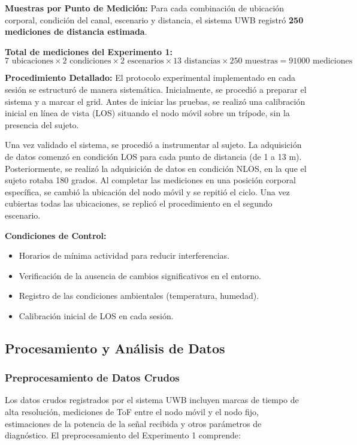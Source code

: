 \textbf{Muestras por Punto de Medición:}
Para cada combinación de ubicación corporal, condición del canal, escenario y distancia, el sistema UWB registró \textbf{250 mediciones de distancia estimada}.

\textbf{Total de mediciones del Experimento 1:}
$$7 \text{ ubicaciones} \times 2 \text{ condiciones} \times 2 \text{ escenarios} \times 13 \text{ distancias} \times 250 \text{ muestras} = 91000 \text{ mediciones}$$

\textbf{Procedimiento Detallado:}
El protocolo experimental implementado en cada sesión se estructuró de manera sistemática. Inicialmente, se procedió a preparar el sistema y a marcar el grid. Antes de iniciar las pruebas, se realizó una calibración inicial en línea de vista (LOS) situando el nodo móvil sobre un trípode, sin la presencia del sujeto.

Una vez validado el sistema, se procedió a instrumentar al sujeto. La adquisición de datos comenzó en condición LOS para cada punto de distancia (de 1 a 13 m). Posteriormente, se realizó la adquisición de datos en condición NLOS, en la que el sujeto rotaba 180 grados. Al completar las mediciones en una posición corporal específica, se cambió la ubicación del nodo móvil y se repitió el ciclo. Una vez cubiertas todas las ubicaciones, se replicó el procedimiento en el segundo escenario.

\textbf{Condiciones de Control:}
\begin{itemize}
\item Horarios de mínima actividad para reducir interferencias.
\item Verificación de la ausencia de cambios significativos en el entorno.
\item Registro de las condiciones ambientales (temperatura, humedad).
\item Calibración inicial de LOS en cada sesión.
\end{itemize}

\subsection{Procesamiento y Análisis de Datos}
\label{subsec:procesamiento_analisis}

\subsubsection{Preprocesamiento de Datos Crudos}

Los datos crudos registrados por el sistema UWB incluyen marcas de tiempo de alta resolución, mediciones de ToF entre el nodo móvil y el nodo fijo, estimaciones de la potencia de la señal recibida y otros parámetros de diagnóstico. El preprocesamiento del Experimento 1 comprende:

